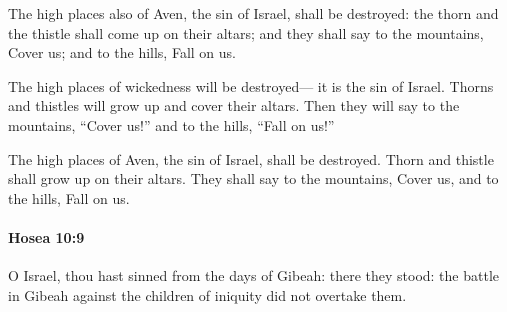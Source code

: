 			\begin{versebox}
					\item[BHS] 
					\item[LXX] 
					\item[ASV] The high places also of Aven, the sin of Israel, shall be destroyed: the thorn and the thistle shall come up on their altars; and they shall say to the mountains, Cover us; and to the hills, Fall on us.
					\item[NIV] The high places of wickedness will be destroyed— it is the sin of Israel. Thorns and thistles will grow up and cover their altars. Then they will say to the mountains, “Cover us!” and to the hills, “Fall on us!”
					\item[NRSV] The high places of Aven, the sin of Israel, shall be destroyed. Thorn and thistle shall grow up on their altars. They shall say to the mountains, Cover us, and to the hills, Fall on us.
			\end{versebox}

		\paragraph{Hosea 10:9} %
			\label{HOSEA-10-9}

			O Israel, thou hast sinned from the days of Gibeah: there they stood: the battle in Gibeah against the children of iniquity did not overtake them.

